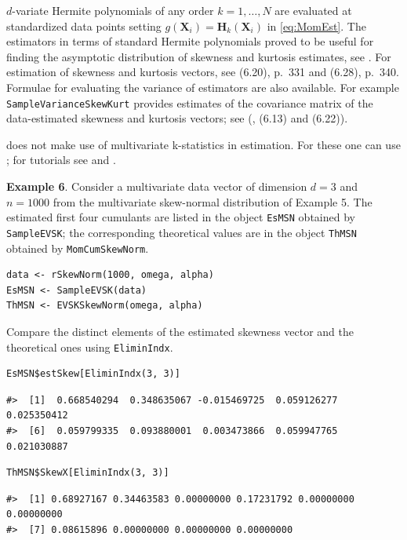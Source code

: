 \(d\)-variate Hermite polynomials of any order \(k=1, \dots, N\) are evaluated at standardized data points setting \(g(\mathbf{X}_i)=\mathbf{H}_k(\mathbf{X}_i)\) in \eqref{eq:MomEst}. The estimators in terms of standard Hermite polynomials proved to be useful for finding the asymptotic distribution of skewness and kurtosis estimates, see \citet{jamma2021SJS}. For estimation of skewness and kurtosis vectors, see \citet{terdik2021multivariate} (6.20), p.~331 and (6.28), p.~340. Formulae for evaluating the variance of estimators are also available. For example \texttt{SampleVarianceSkewKurt} provides estimates of the covariance matrix of the data-estimated skewness and kurtosis vectors; see (\citet{terdik2021multivariate}, (6.13) and (6.22)).

 does not make use of multivariate k-statistics in estimation. For these one can use ; for tutorials see \citet{dinardo22b} and \citet{smith2020tutorial}.

\textbf{Example 6}. Consider a multivariate data vector of dimension \(d=3\) and \(n=1000\) from the multivariate skew-normal distribution of Example 5. The estimated first four cumulants are listed in the object \texttt{EsMSN} obtained by \texttt{SampleEVSK}; the corresponding theoretical values are in the object \texttt{ThMSN} obtained by \texttt{MomCumSkewNorm}.

\begin{verbatim}
data <- rSkewNorm(1000, omega, alpha)
EsMSN <- SampleEVSK(data)
ThMSN <- EVSKSkewNorm(omega, alpha)
\end{verbatim}

Compare the distinct elements of the estimated skewness vector and the theoretical ones using \texttt{EliminIndx}.

\begin{verbatim}
EsMSN$estSkew[EliminIndx(3, 3)]
\end{verbatim}

\begin{verbatim}
#>  [1]  0.668540294  0.348635067 -0.015469725  0.059126277  0.025350412
#>  [6]  0.059799335  0.093880001  0.003473866  0.059947765  0.021030887
\end{verbatim}

\begin{verbatim}
ThMSN$SkewX[EliminIndx(3, 3)]
\end{verbatim}

\begin{verbatim}
#>  [1] 0.68927167 0.34463583 0.00000000 0.17231792 0.00000000 0.00000000
#>  [7] 0.08615896 0.00000000 0.00000000 0.00000000
\end{verbatim}

